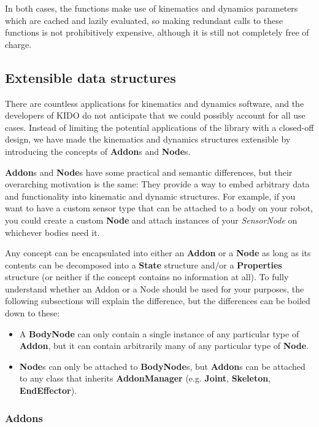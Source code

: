 In both cases, the functions make use of kinematics and dynamics parameters which are cached and lazily evaluated, so making redundant calls to these functions is not prohibitively expensive, although it is still not completely free of charge.

\subsection{Extensible data structures}

There are countless applications for kinematics and dynamics software, and the developers of KIDO do not anticipate that we could possibly account for all use cases. Instead of limiting the potential applications of the library with a closed-off design, we have made the kinematics and dynamics structures extensible by introducing the concepts of \textbf{Addon}s and \textbf{Node}s.

\textbf{Addon}s and \textbf{Node}s have some practical and semantic differences, but their overarching motivation is the same: They provide a way to embed arbitrary data and functionality into kinematic and dynamic structures. For example, if you want to have a custom sensor type that can be attached to a body on your robot, you could create a custom \textbf{Node} and attach instances of your \textit{SensorNode} on whichever bodies need it.

Any concept can be encapsulated into either an \textbf{Addon} or a \textbf{Node} as long as its contents can be decomposed into a \textbf{State} structure and/or a \textbf{Properties} structure (or neither if the concept contains no information at all). To fully understand whether an Addon or a Node should be used for your purposes, the following subsections will explain the difference, but the differences can be boiled down to these:

\begin{itemize}
  \item A \textbf{BodyNode} can only contain a single instance of any particular type of \textbf{Addon}, but it can contain arbitrarily many of any particular type of \textbf{Node}.
  \item \textbf{Node}s can only be attached to \textbf{BodyNode}s, but \textbf{Addon}s can be attached to any class that inherits \textbf{AddonManager} (e.g. \textbf{Joint}, \textbf{Skeleton}, \textbf{EndEffector}).
\end{itemize}

\subsubsection{Addons}
\label{sec:addons}

